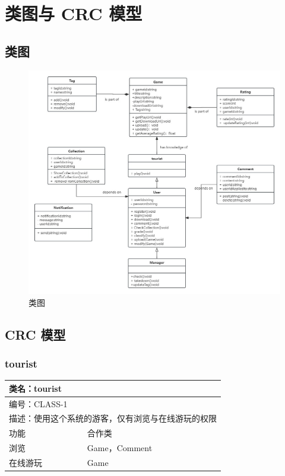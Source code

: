 \documentclass[12pt]{ctexart} %
\begin{document}
\section{类图与 CRC 模型}
\subsection{类图}
\begin{figure}[htbp]
  \centering
  \includegraphics[width=1\textwidth]{lei.jpg}
  \caption{类图}
\end{figure}
\subsection{CRC 模型}

\subsubsection{tourist}
\begin{tabular}{|l|l|}
  \hline
  \multicolumn{2}{|l|}{类名：tourist} \\
  \hline
  \multicolumn{2}{|l|}{编号：CLASS-1} \\
  \hline
  \multicolumn{2}{|l|}{描述：使用这个系统的游客，仅有浏览与在线游玩的权限} \\
  \hline
  功能 & 合作类 \\
  \hline
  浏览 & Game，Comment\\
  \hline
  在线游玩 & Game\\
  \hline
  \end{tabular}
\end{document}

